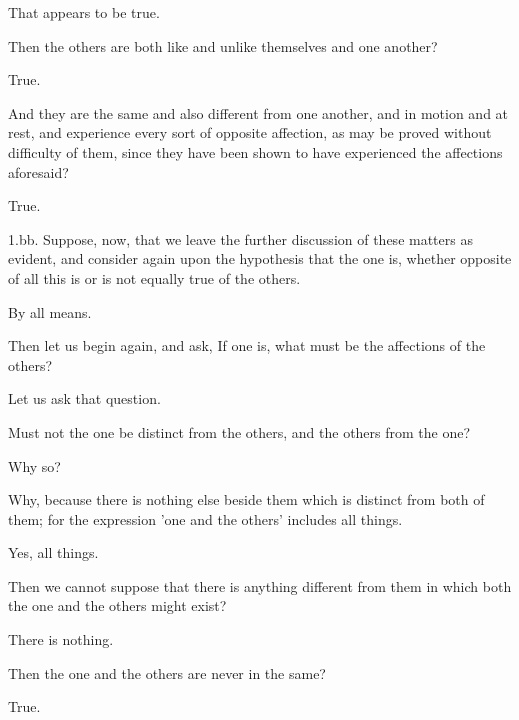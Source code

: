 \documentclass[11pt,letter]{article}
\begin{document}
\par  That appears to be true.

\par  Then the others are both like and unlike themselves and one another?

\par  True.

\par  And they are the same and also different from one another, and in motion and at rest, and experience every sort of opposite affection, as may be proved without difficulty of them, since they have been shown to have experienced the affections aforesaid?

\par  True.

\par  1.bb. Suppose, now, that we leave the further discussion of these matters as evident, and consider again upon the hypothesis that the one is, whether opposite of all this is or is not equally true of the others.

\par  By all means.

\par  Then let us begin again, and ask, If one is, what must be the affections of the others?

\par  Let us ask that question.

\par  Must not the one be distinct from the others, and the others from the one?

\par  Why so?

\par  Why, because there is nothing else beside them which is distinct from both of them; for the expression 'one and the others' includes all things.

\par  Yes, all things.

\par  Then we cannot suppose that there is anything different from them in which both the one and the others might exist?

\par  There is nothing.

\par  Then the one and the others are never in the same?

\par  True.
\end{document}
